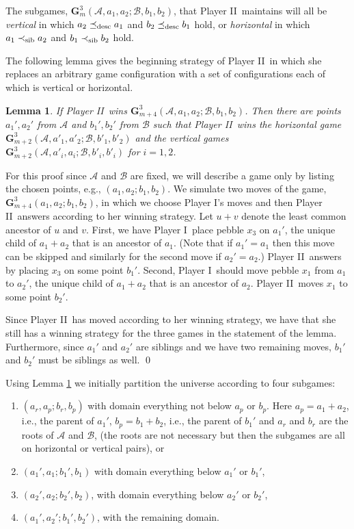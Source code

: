 \documentclass{LMCS}
\newcommand{\dupl}{Player II}
\newcommand{\spoiler}{Player I}
\newcommand{\desc}{\preceq_{\rm desc}}\newcommand{\sib}{\preceq_{\rm sib}}\newcommand{\lsib}{\prec_{\rm sib}}
\newcommand{\A}{{\mathcal{A}}}
\newcommand{\B}{{\mathcal{B}}}
\newcommand{\G}{{\mathbf G}}
\theoremstyle{plain}
\newtheorem{lemma}[theorem]{Lemma}
\theoremstyle{definition}
\begin{document}
The subgames, $\G^3_{m}(\A,a_1,a_2;\B,b_1,b_2)$, that \dupl\
maintains will all be {\em vertical} in which $a_2 \desc a_1$ and
$b_2 \desc b_1$ hold, or {\em horizontal} in which $a_1 \lsib a_2$ and
$b_1 \lsib b_2$ hold.

The following lemma gives the beginning strategy of \dupl\ in which she
replaces an arbitrary game configuration with a set of configurations
each of which is vertical or horizontal.

\begin{lemma}\label{Rajeev le}
If \dupl\ wins $\G^3_{m+4}(\A,a_1,a_2;\B,b_1,b_2)$. Then there are
points $a_1',a_2'$ from $\A$ and $b_1',b_2'$ from $\B$ 
such that \dupl\ wins the horizontal game
$\G^3_{m+2}(\A,a'_1,a'_2;\B,b'_1,b'_2)$ and the vertical games
$\G^3_{m+2}(\A,a'_i,a_i;\B,b'_i,b'_i)$ for $i= 1,2$.
\end{lemma}

\proof
For this proof since $\A$ and $\B$ are fixed, we will 
describe a game only by listing the chosen points, 
e.g., $(a_1,a_2;b_1,b_2)$.  We simulate two moves of the
  game, $\G^3_{m+4}(a_1,a_2;b_1,b_2)$, in which we choose
  \spoiler's moves and then \dupl\ answers according to her winning
  strategy.  Let $u+v$ denote the least common ancestor of $u$ and
  $v$. First, we have \spoiler\ place pebble $x_3$ on $a_1'$, the
  unique child of $a_1+a_2$ that is an ancestor of $a_1$.  (Note that
  if $a_1' = a_1$ then this move can be skipped and similarly for the
  second move if $a_2' = a_2$.)  \dupl\ answers by placing $x_3$ on
  some point $b_1'$.  Second, \spoiler\ should move pebble $x_1$ from $a_1$
  to $a_2'$, the unique child of $a_1+a_2$ that is an ancestor of
  $a_2$.  \dupl\ moves $x_1$ to some point $b_2'$.

Since \dupl\ has
moved according to her winning strategy, we have that she still has a
winning strategy for the three games in the statement of the lemma.
Furthermore, since $a_1'$ and $a_2'$ are siblings and we have two
remaining moves, $b_1'$ and $b_2'$ must be siblings as well.
\qed 

Using Lemma \ref{Rajeev le} we initially partition the universe
according to four subgames:
\begin{enumerate}[$\bullet$]
\item  $(a_r,a_p;b_r,b_p)$ with domain everything not below $a_p$ or
  $b_p$. Here $a_p=a_1+a_2$, i.e., the parent of $a_1'$,
  $b_p=b_1+b_2$, i.e., the parent of $b_1'$ and $a_r$ and $b_r$ are
  the roots of $\A$ and $\B$, (the roots are not necessary but then
  the subgames are all on horizontal or vertical pairs), or
\item  $(a_1', a_1;b_1',b_1)$ with domain everything below $a_1'$ or $b_1'$,
\item  $(a_2', a_2;b_2',b_2)$, with domain everything below $a_2'$ or
  $b_2'$, 
\item  $(a_1', a_2';b_1',b_2')$, with the remaining domain.
\end{enumerate}
\end{document}

